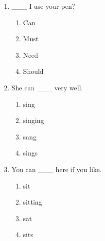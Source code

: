 \documentclass[11pt,a4paper]{ctexart}
\begin{document}
\begin{enumerate}[leftmargin=*,itemsep=4pt]
\begin{enumerate}[label=\Alph*.,leftmargin=2em,itemsep=1pt,topsep=2pt]
\item helps
\end{enumerate}
\item \_\_\_ I use your pen?
\begin{enumerate}[label=\Alph*.,leftmargin=2em,itemsep=1pt,topsep=2pt]
\item Can
\item Must
\item Need
\item Should
\end{enumerate}
\item She can \_\_\_ very well.
\begin{enumerate}[label=\Alph*.,leftmargin=2em,itemsep=1pt,topsep=2pt]
\item sing
\item singing
\item sang
\item sings
\end{enumerate}
\item You can \_\_\_ here if you like.
\begin{enumerate}[label=\Alph*.,leftmargin=2em,itemsep=1pt,topsep=2pt]
\item sit
\item sitting
\item sat
\item sits
\end{enumerate}
\end{enumerate}
\end{document}
